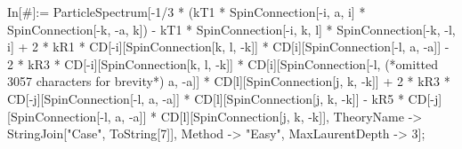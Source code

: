 In[\#]:= ParticleSpectrum[-1/3 * (kT1 * SpinConnection[-i, a, i] * SpinConnection[-k, -a, k]) - kT1 * SpinConnection[-i, k, l] * SpinConnection[-k, -l, i] + 2 * kR1 * CD[-i][SpinConnection[k, l, -k]] * CD[i][SpinConnection[-l, a, -a]] - 2 * kR3 * CD[-i][SpinConnection[k, l, -k]] * CD[i][SpinConnection[-l, (*omitted 3057 characters for brevity*) a, -a]] * CD[l][SpinConnection[j, k, -k]] + 2 * kR3 * CD[-j][SpinConnection[-l, a, -a]] * CD[l][SpinConnection[j, k, -k]] - kR5 * CD[-j][SpinConnection[-l, a, -a]] * CD[l][SpinConnection[j, k, -k]], TheoryName -> StringJoin["Case", ToString[7]], Method -> "Easy", MaxLaurentDepth -> 3];